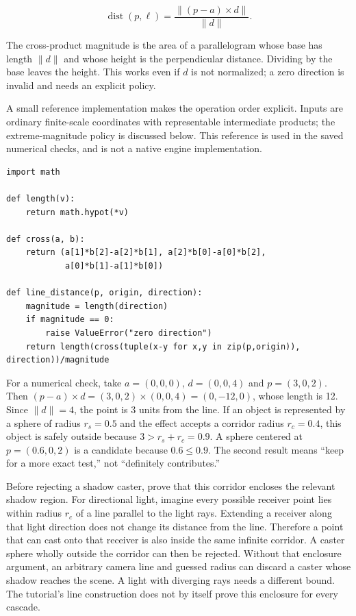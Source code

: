 \[
\operatorname{dist}(p,\ell)=\frac{\|(p-a)\times d\|}{\|d\|}.
\]

The cross-product magnitude is the area of a parallelogram whose base has length \(\|d\|\) and whose height is the perpendicular distance. Dividing by the base leaves the height. This works even if \(d\) is not normalized; a zero direction is invalid and needs an explicit policy.

A small reference implementation makes the operation order explicit. Inputs are ordinary finite-scale coordinates with representable intermediate products; the extreme-magnitude policy is discussed below. This reference is used in the saved numerical checks, and is not a native engine implementation.

\begin{verbatim}
import math

def length(v):
    return math.hypot(*v)

def cross(a, b):
    return (a[1]*b[2]-a[2]*b[1], a[2]*b[0]-a[0]*b[2],
            a[0]*b[1]-a[1]*b[0])

def line_distance(p, origin, direction):
    magnitude = length(direction)
    if magnitude == 0:
        raise ValueError("zero direction")
    return length(cross(tuple(x-y for x,y in zip(p,origin)), direction))/magnitude
\end{verbatim}

For a numerical check, take \(a=(0,0,0)\), \(d=(0,0,4)\) and \(p=(3,0,2)\). Then \((p-a)\times d=(3,0,2)\times(0,0,4)=(0,-12,0)\), whose length is 12. Since \(\|d\|=4\), the point is 3 units from the line. If an object is represented by a sphere of radius \(r_s=0.5\) and the effect accepts a corridor radius \(r_c=0.4\), this object is safely outside because \(3>r_s+r_c=0.9\). A sphere centered at \(p=(0.6,0,2)\) is a candidate because \(0.6\leq0.9\). The second result means ``keep for a more exact test,'' not ``definitely contributes.''

Before rejecting a shadow caster, prove that this corridor encloses the relevant shadow region. For directional light, imagine every possible receiver point lies within radius \(r_c\) of a line parallel to the light rays. Extending a receiver along that light direction does not change its distance from the line. Therefore a point that can cast onto that receiver is also inside the same infinite corridor. A caster sphere wholly outside the corridor can then be rejected. Without that enclosure argument, an arbitrary camera line and guessed radius can discard a caster whose shadow reaches the scene. A light with diverging rays needs a different bound. The tutorial's line construction does not by itself prove this enclosure for every cascade.

